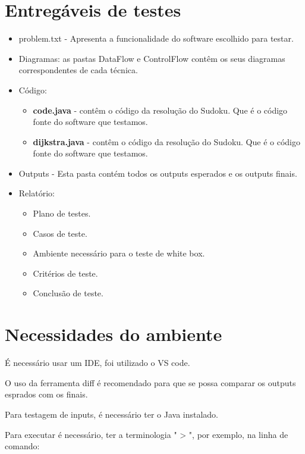 \documentclass{article}
\begin{document}
\section{Entregáveis de testes}
\begin{itemize}
    \item problem.txt - Apresenta a funcionalidade do software escolhido para testar.
    \item Diagramas: as pastas DataFlow e ControlFlow contêm os seus diagramas correspondentes de cada técnica.
    \item Código:
    \begin{itemize}
        \item \textbf{code.java} - contêm o código da resolução do Sudoku. Que é o código fonte do software que testamos.
        \item \textbf{dijkstra.java} - contêm o código da resolução do Sudoku. Que é o código fonte do software que testamos.
    \end{itemize}
    \item Outputs - Esta pasta contém todos os outputs esperados e os outputs finais.
    \item Relatório:
    \begin{itemize}
        \item Plano de testes.
        \item Casos de teste.
        \item Ambiente necessário para o teste de white box.
        \item Critérios de teste.
        \item Conclusão de teste.
    \end{itemize}
\end{itemize}

\section{Necessidades do ambiente}

\texttt{}\par É necessário usar um IDE, foi utilizado o VS code.

O uso da ferramenta diff é recomendado para que se possa comparar os outputs esprados com os finais.

Para testagem de inputs, é necessário ter o Java instalado.

Para executar é necessário, ter a terminologia " \textgreater{} ", por exemplo, na linha de comando:\\
\end{document}
